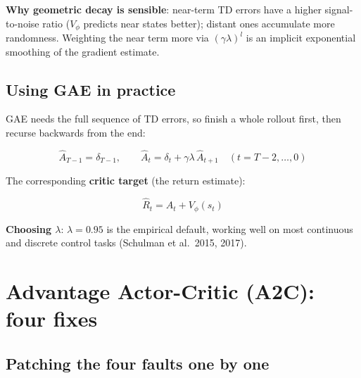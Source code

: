 \documentclass{article}
\begin{document}
\textbf{Why geometric decay is sensible}: near-term TD errors have a higher signal-to-noise ratio ($V_\phi$ predicts near states better); distant ones accumulate more randomness. Weighting the near term more via $(\gamma\lambda)^l$ is an implicit exponential smoothing of the gradient estimate.

\subsection*{Using GAE in practice}

GAE needs the full sequence of TD errors, so finish a whole rollout first, then recurse backwards from the end:

\[
\hat{A}_{T-1} = \delta_{T-1}, \qquad
\hat{A}_t = \delta_t + \gamma\lambda\,\hat{A}_{t+1} \quad (t = T-2, \ldots, 0)
\]

The corresponding \textbf{critic target} (the return estimate):

\[
\hat{R}_t = \hat{A}_t + V_\phi(s_t)
\]

\textbf{Choosing $\lambda$}: $\lambda = 0.95$ is the empirical default, working well on most continuous and discrete control tasks (Schulman et al.\ 2015, 2017).

\section*{Advantage Actor-Critic (A2C): four fixes}

\subsection*{Patching the four faults one by one}
\end{document}
